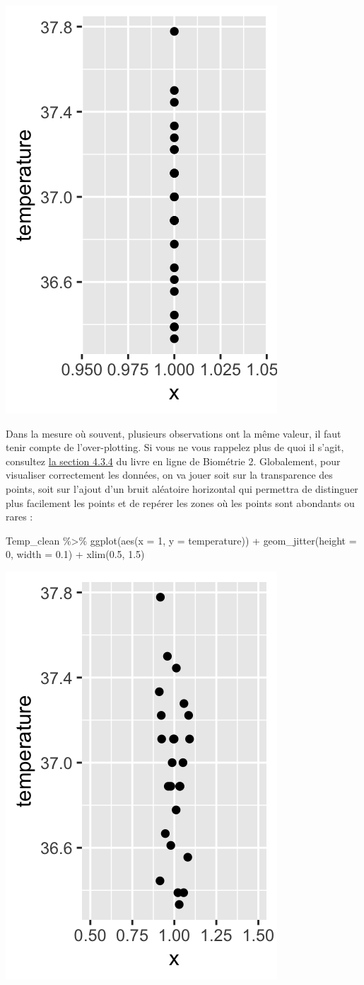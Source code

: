 \documentclass[
  a4paper,
]{article}
\newenvironment{Shaded}{\begin{snugshade}}{\end{snugshade}}
\newcommand{\AttributeTok}[1]{\textcolor[rgb]{0.00,0.34,0.68}{#1}}
\newcommand{\DecValTok}[1]{\textcolor[rgb]{0.69,0.50,0.00}{#1}}
\newcommand{\FloatTok}[1]{\textcolor[rgb]{0.69,0.50,0.00}{#1}}
\newcommand{\FunctionTok}[1]{\textcolor[rgb]{0.39,0.29,0.61}{#1}}
\newcommand{\NormalTok}[1]{\textcolor[rgb]{0.12,0.11,0.11}{#1}}
\newcommand{\SpecialCharTok}[1]{\textcolor[rgb]{0.24,0.68,0.91}{#1}}
\begin{document}
\begin{center}\includegraphics[width=0.25\linewidth]{figure/unnamed-chunk-15-1} \end{center}

Dans la mesure où souvent, plusieurs observations ont la même valeur, il faut tenir compte de l'over-plotting. Si vous ne vous rappelez plus de quoi il s'agit, consultez \href{https://besibo.github.io/DA/viz.html\#over-plotting}{la section 4.3.4} du livre en ligne de Biométrie 2. Globalement, pour visualiser correctement les données, on va jouer soit sur la transparence des points, soit sur l'ajout d'un bruit aléatoire horizontal qui permettra de distinguer plus facilement les points et de repérer les zones où les points sont abondants ou rares :

\begin{Shaded}
\begin{Highlighting}[]
\NormalTok{Temp\_clean }\SpecialCharTok{\%\textgreater{}\%} 
  \FunctionTok{ggplot}\NormalTok{(}\FunctionTok{aes}\NormalTok{(}\AttributeTok{x =} \DecValTok{1}\NormalTok{, }\AttributeTok{y =}\NormalTok{ temperature)) }\SpecialCharTok{+}
  \FunctionTok{geom\_jitter}\NormalTok{(}\AttributeTok{height =} \DecValTok{0}\NormalTok{, }\AttributeTok{width =} \FloatTok{0.1}\NormalTok{) }\SpecialCharTok{+}
  \FunctionTok{xlim}\NormalTok{(}\FloatTok{0.5}\NormalTok{, }\FloatTok{1.5}\NormalTok{)}
\end{Highlighting}
\end{Shaded}

\begin{center}\includegraphics[width=0.25\linewidth]{figure/unnamed-chunk-16-1} \end{center}
\end{document}

